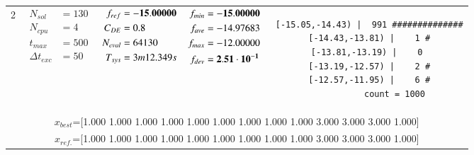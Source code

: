 \begin{table*} [!t]
\begin{tabular}[c]{ccccc}
2
&
{$\!\begin{aligned}
    N_{sol}        &= 130 \\
	N_{cpu}        &= 4 \\
	t_{max}        &= 500 \\
	\Delta t_{exc} &= 50
\end{aligned}$}
&
{$\!\begin{aligned}
	f_{ref} &= {\bf -15.00000} \\
	C_{DE}   &= 0.8 \\
	N_{eval} &= 64130 \\
	T_{sys}  &= 3m12.349s
\end{aligned}$}
&
{$\!\begin{aligned}
    f_{min} &= {\bf -15.00000} \\
    f_{ave} &= -14.97683 \\
    f_{max} &= -12.00000 \\
    f_{dev} &= {\bf 2.51\cdot 10^{-1}}
\end{aligned}$}
&
\begin{minipage}{4.1cm} \fontsize{5pt}{6pt}
\begin{verbatim}
 [-15.05,-14.43) |  991 ##############
 [-14.43,-13.81) |    1 #
 [-13.81,-13.19) |    0 
 [-13.19,-12.57) |    2 #
 [-12.57,-11.95) |    6 #
           count = 1000
 \end{verbatim}
\end{minipage} \\
\multicolumn{5}{c}{{\scriptsize $x_{best}$=[1.000 1.000 1.000 1.000 1.000 1.000 1.000 1.000 1.000 3.000 3.000 3.000 1.000]}} \\
\multicolumn{5}{c}{{\scriptsize $x_{ref.}$=[1.000 1.000 1.000 1.000 1.000 1.000 1.000 1.000 1.000 3.000 3.000 3.000 1.000]}} \\

\hline




\end{tabular}
\end{table*}

